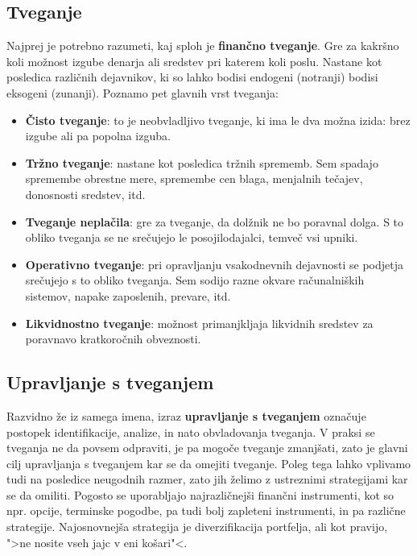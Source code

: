 \documentclass[12pt,a4paper]{amsart}
\theoremstyle{definition} %
\theoremstyle{plain} %
\begin{document}
\subsection{Tveganje} Najprej je potrebno razumeti, kaj sploh je \textbf{finančno tveganje}. Gre za 
kakršno koli možnost izgube denarja ali sredstev pri katerem koli poslu. Nastane kot posledica
različnih dejavnikov, ki so lahko bodisi endogeni (notranji) bodisi eksogeni (zunanji). Poznamo 
pet glavnih vrst tveganja:
\begin{itemize}
  \item \textbf{Čisto tveganje}: to je neobvladljivo tveganje, ki ima le dva možna izida: brez
	izgube ali pa popolna izguba.
  \item \textbf{Tržno tveganje}: nastane kot posledica tržnih sprememb. Sem spadajo spremembe
	obrestne mere, spremembe cen blaga, menjalnih tečajev, donosnosti sredstev, itd.
  \item \textbf{Tveganje neplačila}: gre za tveganje, da dolžnik ne bo poravnal dolga. S to obliko
	tveganja se ne srečujejo le posojilodajalci, temveč vsi upniki.
  \item \textbf{Operativno tveganje}: pri opravljanju vsakodnevnih dejavnosti se podjetja srečujejo
	s to obliko tveganja. Sem sodijo razne okvare računalniških sistemov, napake zaposlenih, 
	prevare, itd.
  \item \textbf{Likvidnostno tveganje}: možnost primanjkljaja likvidnih sredstev za poravnavo
	kratkoročnih obveznosti.
\end{itemize}

\subsection{Upravljanje s tveganjem}
Razvidno že iz samega imena, izraz \textbf{upravljanje s tveganjem} označuje postopek identifikacije, 
analize, in nato obvladovanja tveganja. V praksi se tveganja ne da povsem odpraviti, je pa 
mogoče tveganje zmanjšati, zato je glavni cilj upravljanja s tveganjem kar se da omejiti tveganje. 
Poleg tega lahko vplivamo tudi na posledice neugodnih razmer, zato jih želimo z ustreznimi 
strategijami kar se da omiliti. Pogosto se uporabljajo najrazličnejši finančni instrumenti, kot so npr.
opcije, terminske pogodbe, pa tudi bolj zapleteni instrumenti, in pa različne strategije. 
Najosnovnejša strategija je diverzifikacija portfelja, ali kot pravijo, ">ne nosite vseh jajc v eni 
košari"<.
\end{document}
